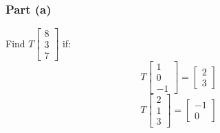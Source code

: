\documentclass[12pt]{article}
\begin{document}
\subsubsection*{Part (a)}
Find $T\begin{bmatrix}
  8\\ 
  3\\ 
  7 
\end{bmatrix}
$ if: 
\[
  T\begin{bmatrix}
    1\\ 
    0\\ 
    -1 
  \end{bmatrix}
   = \begin{bmatrix}
     2\\ 
     3 
    \end{bmatrix}
\]
\[
  T\begin{bmatrix}
    2\\ 
    1\\ 
    3 
  \end{bmatrix} = \begin{bmatrix}
  -1\\ 
  0 
\end{bmatrix}
\]
\end{document}
